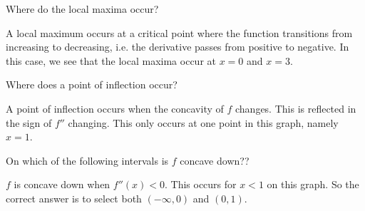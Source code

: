 \documentclass{ximera}
\begin{document}
\begin{example}
\begin{question}
Where do the local maxima occur?
	\begin{multipleChoice}
\end{multipleChoice}
	\begin{hint}
	A local maximum occurs at a critical point where the function transitions from increasing to decreasing, i.e. the derivative passes from positive to negative.  In this case, we see that the local maxima occur at $x=0$ and $x=3$.
\end{hint}
\end{question}

\begin{question}
Where does a point of inflection occur?
	\begin{multipleChoice}
	\choice{$x=0$}
	\choice[correct]{$x=1$}
	\choice{$x=2$}
	\choice{$x=3$}
\end{multipleChoice}

\begin{hint}
	A point of inflection occurs when the concavity of $f$ changes.  This is reflected in the sign of $f''$ changing.  This only occurs at one point in this graph, namely $x=1$.
\end{hint}

\end{question}

\begin{question}
On which of the following intervals is $f$ concave down?? 
	\begin{multipleChoice}
	\end{multipleChoice}

\begin{hint}
	$f$ is concave down when $f''(x)<0$.  This occurs for $x<1$ on this graph.  So the correct answer is to select both $(-\infty, 0)$ and $(0,1)$. 
\end{hint}
\end{question}
	

\end{example}
\end{document}
